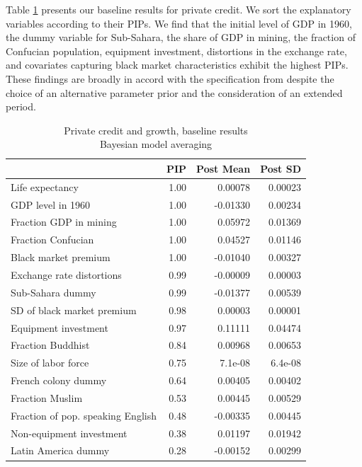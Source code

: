 \begin{refsection}
Table \ref{ch2tab:PC6011hyp} presents our baseline results for private credit. We sort the explanatory variables according to their \acp{PIP}. We find that the initial level of \ac{GDP} in 1960, the dummy variable for Sub-Sahara, the share of GDP in mining, the fraction of Confucian population, equipment investment, distortions in the exchange rate, and covariates capturing black market characteristics exhibit the highest \acp{PIP}. These findings are broadly in accord with the specification from \textcite{Fernandezetal2001} despite the choice of an alternative parameter prior and the consideration of an extended period. 
%
\begin{table}[!ht]
	\centering
	\caption{Private credit and growth, baseline results\\
		Bayesian model averaging}
	\label{ch2tab:PC6011hyp}
	\footnotesize
	\begin{tabular}{lrrr}
		\toprule
		& PIP & Post Mean & Post SD \\ 
		\toprule
		Life expectancy & 1.00 & 0.00078 & 0.00023 \\ 
		GDP level in 1960 & 1.00 & -0.01330 & 0.00234 \\ 
		Fraction GDP in mining & 1.00 & 0.05972 & 0.01369 \\ 
		Fraction Confucian & 1.00 & 0.04527 & 0.01146 \\ 
		Black market premium & 1.00 & -0.01040 & 0.00327 \\ 
		Exchange rate distortions & 0.99 & -0.00009 & 0.00003 \\ 
		Sub-Sahara dummy & 0.99 & -0.01377 & 0.00539 \\ 
		SD of black market premium & 0.98 & 0.00003 & 0.00001 \\ 
		Equipment investment & 0.97 & 0.11111 & 0.04474 \\ 
		Fraction Buddhist & 0.84 & 0.00968 & 0.00653 \\ 
		Size of labor force & 0.75 & 7.1e-08 & 6.4e-08 \\ 
		French colony dummy & 0.64 & 0.00405 & 0.00402 \\ 
		Fraction Muslim & 0.53 & 0.00445 & 0.00529 \\ 
		Fraction of pop. speaking English & 0.48 & -0.00335 & 0.00445 \\ 
		Non-equipment investment & 0.38 & 0.01197 & 0.01942 \\ 
		Latin America dummy & 0.28 & -0.00152 & 0.00299 \\ 

\end{tabular}
\end{table}
\end{refsection}
